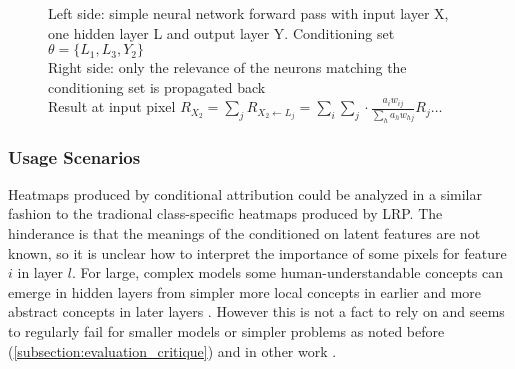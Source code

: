 \begin{figure}[htbp]

    \caption{Left side: simple neural network forward pass with input layer X, one hidden layer L and output layer Y. Conditioning set $\theta = \{L_1, L_3, Y_2\}$ \\ Right side: only the relevance of the neurons matching the conditioning set is propagated back \\
        Result at input pixel $R_{X_2} = \sum_{j}  R_{X_2 \gets L_j} =  \sum_i \sum_{j} \cdot \frac{a_i w_{ij}}{\sum_h a_h w_{hj}} R_j \dots$ }
    \label{fig:crp_example_condition}
\end{figure}

\subsubsection*{Usage Scenarios}
Heatmaps produced by conditional attribution could be analyzed in a similar fashion to the tradional class-specific heatmaps produced by LRP. The hinderance is that the meanings of the conditioned on latent features are not known, so it is unclear how to interpret the importance of some pixels for feature $i$ in layer $l$. For large, complex models some human-understandable concepts can emerge in hidden layers from simpler more local concepts in earlier and more abstract concepts in later layers \cite{Bau2017, Hohman2020, Olah2017, Bau2020}. However this is not a fact to rely on and seems to regularly fail for smaller models or simpler problems as noted before (\autoref{subsection:evaluation_critique}) and in other work .

